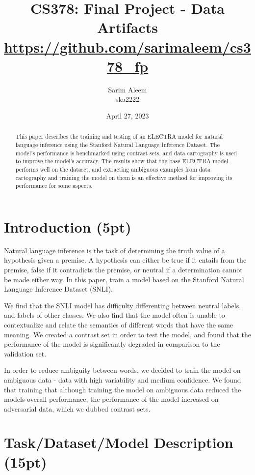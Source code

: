\documentclass[twocolumn]{article}
\title{CS378: Final Project - Data Artifacts \\ \url{https://github.com/sarimaleem/cs378_fp}}
\author{Sarim Aleem \\ ska2222}
\date{April 27, 2023}
\begin{document}
\maketitle


\begin{abstract}

This paper describes the training and testing of an ELECTRA model for natural
language inference using the Stanford Natural Language Inference Dataset. The
model's performance is benchmarked using contrast sets, and data cartography is
used to improve the model's accuracy. The results show that the base ELECTRA
model performs well on the dataset, and extracting ambiguous examples from data
cartography and training the model on them is an effective method for improving
its performance for some aspects. 

\end{abstract}

\section{Introduction (5pt)}

Natural language inference is the task of determining the truth value of a
hypothesis given a premise. A hypothesis can either be true if it entails from
the premise, false if it contradicts the premise, or neutral if a determination
cannot be made either way. In this paper, train a model based on the Stanford
Natural Language Inference Dataset (SNLI).

We find that the SNLI model has difficulty differenting between neutral labels,
and labels of other classes. We also find that the model often is unable to
contextualize and relate the semantics of different words that have the same
meaning. We created a contrast set in order to test the model, and found that
the performance of the model is significantly degraded in comparison to the
validation set.

In order to reduce ambiguity between words, we decided to train the model on
ambiguous data - data with high variability and medium confidence. We found that
training that although training the model on ambiguous data reduced the models
overall performance, the performance of the model increased on adversarial data,
which we dubbed contrast sets.

\section{Task/Dataset/Model Description (15pt)}
\end{document}
